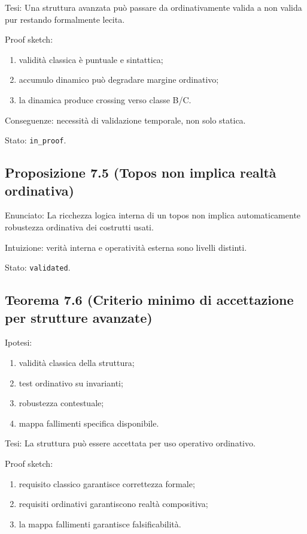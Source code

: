 Tesi:
Una struttura avanzata può passare da ordinativamente valida a non valida pur restando formalmente lecita.

Proof sketch:

\begin{enumerate}
\def\labelenumi{\arabic{enumi}.}
\tightlist
\item
  validità classica è puntuale e sintattica;
\item
  accumulo dinamico può degradare margine ordinativo;
\item
  la dinamica produce crossing verso classe B/C.
\end{enumerate}

Conseguenze:
necessità di validazione temporale, non solo statica.

Stato: \texttt{in\_proof}.

\subsection{Proposizione 7.5 (Topos non implica realtà ordinativa)}

Enunciato:
La ricchezza logica interna di un topos non implica automaticamente robustezza ordinativa dei costrutti usati.

Intuizione:
verità interna e operatività esterna sono livelli distinti.

Stato: \texttt{validated}.

\subsection{Teorema 7.6 (Criterio minimo di accettazione per strutture avanzate)}

Ipotesi:

\begin{enumerate}
\def\labelenumi{\arabic{enumi}.}
\tightlist
\item
  validità classica della struttura;
\item
  test ordinativo su invarianti;
\item
  robustezza contestuale;
\item
  mappa fallimenti specifica disponibile.
\end{enumerate}

Tesi:
La struttura può essere accettata per uso operativo ordinativo.

Proof sketch:

\begin{enumerate}
\def\labelenumi{\arabic{enumi}.}
\tightlist
\item
  requisito classico garantisce correttezza formale;
\item
  requisiti ordinativi garantiscono realtà compositiva;
\item
  la mappa fallimenti garantisce falsificabilità.
\end{enumerate}

